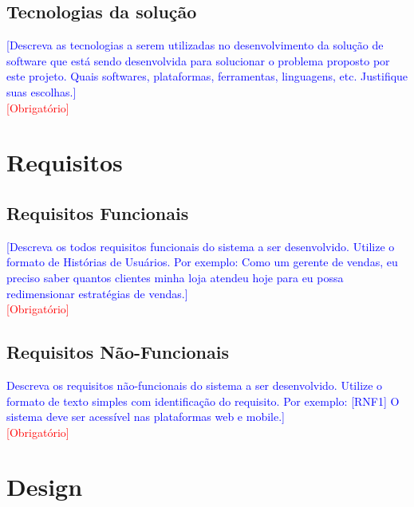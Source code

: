 \documentclass[11pt]{relatorio_tcc_ads_ifba}
\begin{document}
\subsection{Tecnologias da solução}
\textcolor{blue}{
    [Descreva as tecnologias a serem utilizadas no desenvolvimento da solução de software que está sendo desenvolvida para solucionar o problema proposto por este projeto. Quais softwares, plataformas, ferramentas, linguagens, etc. Justifique suas escolhas.]
} \\
\textcolor{red}{[Obrigatório]}

\section{Requisitos}

\subsection{Requisitos Funcionais}
\textcolor{blue}{
    [Descreva os todos requisitos funcionais do sistema a ser desenvolvido. Utilize o formato de Histórias de Usuários. Por exemplo: Como um gerente de vendas, eu preciso saber quantos clientes minha loja atendeu hoje para eu possa redimensionar estratégias de vendas.]
} \\
\textcolor{red}{[Obrigatório]}

\subsection{Requisitos Não-Funcionais}
\textcolor{blue}{
    Descreva os requisitos não-funcionais do sistema a ser desenvolvido. Utilize o formato de texto simples com identificação do requisito. Por exemplo: [RNF1] O sistema deve ser acessível nas plataformas web e mobile.]
} \\
\textcolor{red}{[Obrigatório]}

\section{Design}
\end{document}
